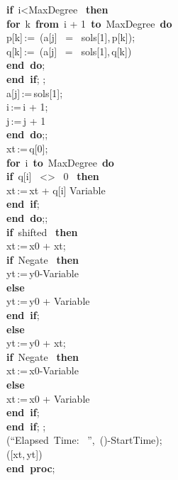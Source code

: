 \documentclass{article}
\begin{document}
\begin{maplelatex}
\begin{center}
\begin{maplelatex}
\begin{center}
{ \textbf{if} \,i<MaxDegree \, \textbf{then} \\
 \textbf{for} \,k \,\textbf{from} \,i + 1 \,\textbf{to} \,MaxDegree \,\textbf{do}\\
 p[k]\,:=\, (a[j] \, = \, sols[1],\,p[k]);\\
 q[k]\,:=\, (a[j] \, = \, sols[1],\,q[k])\\
 \textbf{end\ do};\\
 \textbf{end\ if}; ;\\
 a[j]\,:=\,sols[1];\\
 i\,:=\,i + 1;\\
 j\,:=\,j + 1\\
 \textbf{end\ do};;\\
 xt\,:=\,q[0];\\
 \textbf{for} \,i \,\textbf{to} \,MaxDegree \,\textbf{do}\\
 \textbf{if} \,q[i] \, <> \, 0 \, \textbf{then} \\
 xt\,:=\,xt + q[i] \ast Variable\\
 \textbf{end\ if}; \\
 \textbf{end\ do};;\\
 \textbf{if} \,shifted \, \textbf{then} \\
 xt\,:=\,x0 + xt;\\
 \textbf{if} \,Negate \, \textbf{then} \\
 yt\,:=\,y0-Variable\\
 \textbf{else}\\
 yt\,:=\,y0 + Variable\\
 \textbf{end\ if}; \\
 \textbf{else}\\
 yt\,:=\,y0 + xt;\\
 \textbf{if} \,Negate \, \textbf{then} \\
 xt\,:=\,x0-Variable\\
 \textbf{else}\\
 xt\,:=\,x0 + Variable\\
 \textbf{end\ if}; \\
 \textbf{end\ if}; ;\\
  (``Elapsed\ Time:\ %
'',\, ()-StartTime);\\
  ([xt,\,yt])\\
\textbf{end\ proc};\]}
\end{center}
\end{maplelatex}
\end{center}
\end{maplelatex}
\end{document}
